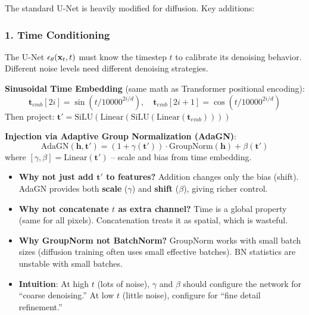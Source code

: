 The standard U-Net is heavily modified for diffusion. Key additions:

\subsubsection{1. Time Conditioning}
The U-Net $\epsilon_\theta(\mathbf{x}_t, t)$ must know the timestep $t$ to calibrate its denoising behavior. Different noise levels need different denoising strategies.

\textbf{Sinusoidal Time Embedding} (same math as Transformer positional encoding):
\begin{equation}
\mathbf{t}_{emb}[2i] = \sin(t / 10000^{2i/d}), \quad \mathbf{t}_{emb}[2i+1] = \cos(t / 10000^{2i/d})
\end{equation}
Then project: $\mathbf{t}' = \text{SiLU}(\text{Linear}(\text{SiLU}(\text{Linear}(\mathbf{t}_{emb}))))$

\textbf{Injection via Adaptive Group Normalization (AdaGN)}:
\begin{equation}
\boxed{\text{AdaGN}(\mathbf{h}, \mathbf{t}') = (1 + \gamma(\mathbf{t}')) \cdot \text{GroupNorm}(\mathbf{h}) + \beta(\mathbf{t}')}
\end{equation}
where $[\gamma, \beta] = \text{Linear}(\mathbf{t}')$ -- scale and bias from time embedding.

\begin{keybox}
\begin{itemize}
\item \textbf{Why not just add $\mathbf{t}'$ to features?} Addition changes only the bias (shift). AdaGN provides both \textbf{scale} ($\gamma$) and \textbf{shift} ($\beta$), giving richer control.
\item \textbf{Why not concatenate $t$ as extra channel?} Time is a global property (same for all pixels). Concatenation treats it as spatial, which is wasteful.
\item \textbf{Why GroupNorm not BatchNorm?} GroupNorm works with small batch sizes (diffusion training often uses small effective batches). BN statistics are unstable with small batches.
\item \textbf{Intuition}: At high $t$ (lots of noise), $\gamma$ and $\beta$ should configure the network for ``coarse denoising.'' At low $t$ (little noise), configure for ``fine detail refinement.''
\end{itemize}
\end{keybox}

